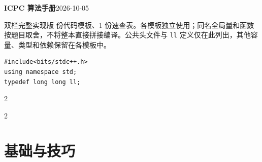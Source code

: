 \documentclass[UTF8,fontset=fandol,a4paper,twoside]{ctexart}
\newcommand{\note}[1]{{\fontsize{10}{12}\selectfont #1\par}}
\begin{document}
\fontsize{10}{12}\selectfont

\begin{center}{\fontsize{15}{17}\selectfont\bfseries ICPC 算法手册}\quad\small 2026-10-05\end{center}
\note{双栏完整实现版 份代码模板、1 份速查表。各模板独立使用；同名全局量和函数按题目取舍，不将整本直接拼接编译。公共头文件与 \texttt{ll} 定义仅在此列出，其他容量、类型和依赖保留在各模板中。}
\begin{lstlisting}
#include<bits/stdc++.h>
using namespace std;
typedef long long ll;
\end{lstlisting}
\begin{multicols}{2}\tableofcontents\end{multicols}
\clearpage\begin{multicols}{2}
\section{基础与技巧}

\end{multicols}
\end{document}
